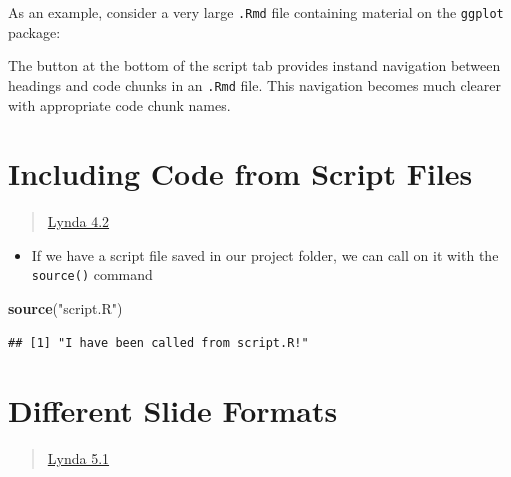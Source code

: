 \documentclass[]{article}
\newenvironment{Shaded}{\begin{snugshade}}{\end{snugshade}}
\newcommand{\KeywordTok}[1]{\textcolor[rgb]{0.13,0.29,0.53}{\textbf{#1}}}
\newcommand{\NormalTok}[1]{#1}
\newcommand{\StringTok}[1]{\textcolor[rgb]{0.31,0.60,0.02}{#1}}
\providecommand{\tightlist}{%
  \setlength{\itemsep}{0pt}\setlength{\parskip}{0pt}}
\begin{document}
As an example, consider a very large \texttt{.Rmd} file containing
material on the \texttt{ggplot} package:

The button at the bottom of the script tab provides instand navigation
between headings and code chunks in an \texttt{.Rmd} file. This
navigation becomes much clearer with appropriate code chunk names.

\hypertarget{including-code-from-script-files}{%
\section{Including Code from Script
Files}\label{including-code-from-script-files}}

\begin{quote}
\href{https://www.lynda.com/RStudio-tutorials/Including-code-from-script-files/699348/2700138-4.html?srchtrk=index\%3a1\%0alinktypeid\%3a2\%0aq\%3ar+markdown\%0apage\%3a1\%0as\%3arelevance\%0asa\%3atrue\%0aproducttypeid\%3a2}{Lynda
4.2}
\end{quote}

\begin{itemize}
\tightlist
\item
  If we have a script file saved in our project folder, we can call on
  it with the \texttt{source()} command
\end{itemize}

\begin{Shaded}
\begin{Highlighting}[]
\KeywordTok{source}\NormalTok{(}\StringTok{"script.R"}\NormalTok{)}
\end{Highlighting}
\end{Shaded}

\begin{verbatim}
## [1] "I have been called from script.R!"
\end{verbatim}

\hypertarget{different-slide-formats}{%
\section{Different Slide Formats}\label{different-slide-formats}}

\begin{quote}
\href{https://www.lynda.com/RStudio-tutorials/Including-code-from-script-files/699348/2700138-4.html?srchtrk=index\%3a1\%0alinktypeid\%3a2\%0aq\%3ar+markdown\%0apage\%3a1\%0as\%3arelevance\%0asa\%3atrue\%0aproducttypeid\%3a2}{Lynda
5.1}
\end{quote}
\end{document}
